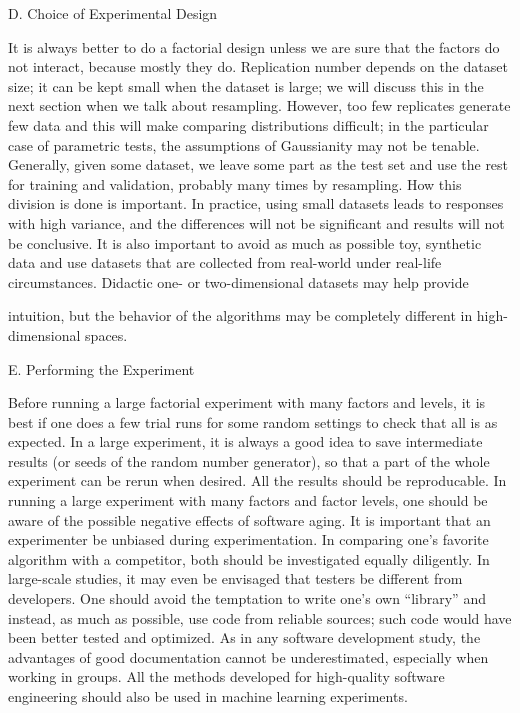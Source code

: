 D. Choice of Experimental Design

It is always better to do a factorial design unless we are sure that the factors do not interact, because mostly they do. Replication number depends on the dataset size; it can be kept small when the dataset is large; we will discuss this in the next section when we talk about resampling. However, too few replicates generate few data and this will make comparing distributions difficult; in the particular case of parametric tests, the assumptions of Gaussianity may not be tenable. Generally, given some dataset, we leave some part as the test set and use the rest for training and validation, probably many times by resampling. How this division is done is important. In practice, using small datasets leads to responses with high variance, and the differences will not be significant and results will not be conclusive. It is also important to avoid as much as possible toy, synthetic data and use datasets that are collected from real-world under real-life circumstances. Didactic one- or two-dimensional datasets may help provide

intuition, but the behavior of the algorithms may be completely different in high-dimensional spaces.

E. Performing the Experiment

Before running a large factorial experiment with many factors and levels, it is best if one does a few trial runs for some random settings to check that all is as expected. In a large experiment, it is always a good idea to save intermediate results (or seeds of the random number generator), so that a part of the whole experiment can be rerun when desired. All the results should be reproducable. In running a large experiment with many factors and factor levels, one should be aware of the possible negative effects of software aging. It is important that an experimenter be unbiased during experimentation. In comparing one’s favorite algorithm with a competitor, both should be investigated equally diligently. In large-scale studies, it may even be envisaged that testers be different from developers. One should avoid the temptation to write one’s own “library” and instead, as much as possible, use code from reliable sources; such code would have been better tested and optimized. As in any software development study, the advantages of good documentation cannot be underestimated, especially when working in groups. All the methods developed for high-quality software engineering should also be used in machine learning experiments.

